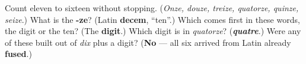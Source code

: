 \begin{tcolorbox}[breakable,colback=teal!4,colframe=teal!35!black,title={Before you move on}]
Count eleven to sixteen without stopping. (\emph{Onze, douze, treize, quatorze, quinze, seize}.) What is the \textbf{-ze}? (Latin \textbf{decem}, \textquotedblleft{}ten\textquotedblright{}.) Which comes first in these words, the digit or the ten? (The \textbf{digit}.) Which digit is in \emph{quatorze}? (\emph{\textbf{quatre}}.) Were any of these built out of \emph{dix} plus a digit? (\textbf{No} — all six arrived from Latin already \textbf{fused}.)
\end{tcolorbox}
